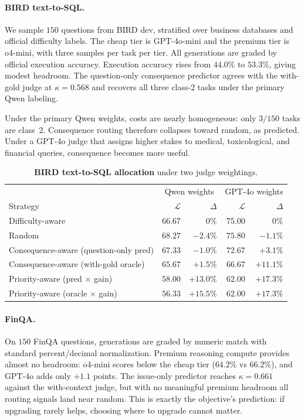 \documentclass{article}
\begin{document}
\paragraph{BIRD text-to-SQL.}
We sample $150$ questions from BIRD dev, stratified over business
databases and official difficulty labels. The cheap tier is GPT-4o-mini
and the premium tier is o4-mini, with three samples per task per tier.
All generations are graded by official execution accuracy. Execution
accuracy rises from $44.0\%$ to $53.3\%$, giving modest headroom. The
question-only consequence predictor agrees with the with-gold judge at
$\kappa=0.568$ and recovers all three class-$2$ tasks under the primary
Qwen labeling.

Under the primary Qwen weights, costs are nearly homogeneous:
only $3/150$ tasks are class~2. Consequence routing therefore collapses
toward random, as predicted. Under a GPT-4o judge that assigns higher
stakes to medical, toxicological, and financial queries, consequence
becomes more useful.

\begin{table}[h]
\centering
\caption{\textbf{BIRD text-to-SQL allocation} under two judge weightings.}
\label{tab:ood-bird}
\small
\begin{tabular}{lrrrr}
\toprule
& \multicolumn{2}{c}{Qwen weights} & \multicolumn{2}{c}{GPT-4o weights} \\
Strategy & $\mathcal{L}$ & $\Delta$ & $\mathcal{L}$ & $\Delta$ \\
\midrule
Difficulty-aware & $66.67$ & $0\%$ & $75.00$ & $0\%$ \\
Random & $68.27$ & $-2.4\%$ & $75.80$ & $-1.1\%$ \\
Consequence-aware (question-only pred) & $67.33$ & $-1.0\%$ & $72.67$ & $+3.1\%$ \\
Consequence-aware (with-gold oracle) & $65.67$ & $+1.5\%$ & $66.67$ & $+11.1\%$ \\
Priority-aware (pred $\times$ gain) & $58.00$ & $+13.0\%$ & $62.00$ & $+17.3\%$ \\
Priority-aware (oracle $\times$ gain) & $\mathbf{56.33}$ & $\mathbf{+15.5\%}$ & $\mathbf{62.00}$ & $\mathbf{+17.3\%}$ \\
\bottomrule
\end{tabular}
\end{table}

\paragraph{FinQA.}
On $150$ FinQA questions, generations are graded by numeric match with
standard percent/decimal normalization. Premium reasoning compute
provides almost no headroom: o4-mini scores below the cheap tier
($64.2\%$ vs $66.2\%$), and GPT-4o adds only $+1.1$ points. The
issue-only predictor reaches $\kappa=0.661$ against the with-context
judge, but with no meaningful premium headroom all routing signals land
near random. This is exactly the objective's prediction: if upgrading
rarely helps, choosing where to upgrade cannot matter.
\end{document}
